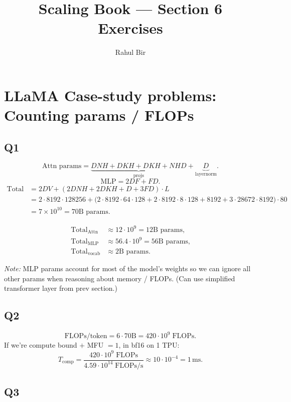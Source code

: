 \documentclass[11pt]{article}
\title{Scaling Book --- Section 6 Exercises}
\author{Rahul Bir}
\date{}
\newcommand{\flops}{\text{FLOPs}}
\newcommand{\flopss}{\text{FLOPs/s}}
\newcommand{\Tcomp}{T_{\text{comp}}}
\begin{document}
\maketitle

\section*{LLaMA Case-study problems: Counting params / FLOPs}

\subsection*{Q1}

\[
\text{Attn params} = \underbrace{DNH + DKH + DKH + NHD}_{\text{projs}} + \underbrace{D}_{\text{layernorm}}.
\]
\[
\text{MLP} = 2DF + FD.
\]
\begin{align*}
\text{Total} &= 2DV + (2DNH + 2DKH + D + 3FD) \cdot L \\
&= 2 \cdot 8192 \cdot 128256 + \big(2 \cdot 8192 \cdot 64 \cdot 128 + 2 \cdot 8192 \cdot 8 \cdot 128 + 8192 + 3 \cdot 28672 \cdot 8192\big) \cdot 80 \\
&= 7 \times 10^{10} = 70\text{B params.}
\end{align*}

\begin{align*}
\text{Total}_{\text{Attn}}  &\approx 12 \cdot 10^9 = 12\text{B params,} \\
\text{Total}_{\text{MLP}}   &\approx 56.4 \cdot 10^9 = 56\text{B params,} \\
\text{Total}_{\text{vocab}} &\approx 2\text{B params.}
\end{align*}

\emph{Note:} MLP params account for most of the model's weights so we can ignore all other params when reasoning about memory / FLOPs. (Can use simplified transformer layer from prev section.)

\subsection*{Q2}

\[
\flops / \text{token} = 6 \cdot 70\text{B} = 420 \cdot 10^9 \;\flops.
\]
If we're compute bound $+$ MFU $= 1$, in bf16 on 1 TPU:
\[
\Tcomp = \frac{420 \cdot 10^9 \;\flops}{4.59 \cdot 10^{14} \;\flopss} \approx 10 \cdot 10^{-4} = 1\,\text{ms}.
\]

\subsection*{Q3}
\end{document}
